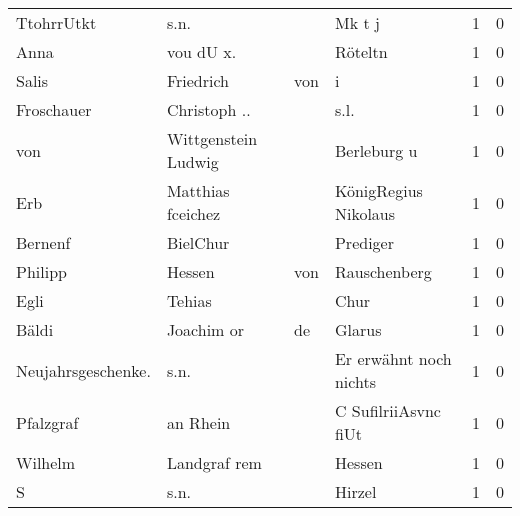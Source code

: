 \begin{center}
\begin{tiny}
\begin{longtabu}{llllrr}
               TtohrrUtkt &                               s.n. &             &                                      Mk t j &          1 &         0 \\
                     Anna &                          vou dU x. &             &                                     Röteltn &          1 &         0 \\
                    Salis &                          Friedrich &         von &                                           i &          1 &         0 \\
               Froschauer &                       Christoph .. &             &                                        s.l. &          1 &         0 \\
                      von &                Wittgenstein Ludwig &             &                                 Berleburg u &          1 &         0 \\
                      Erb &                  Matthias fceichez &             &                        KönigRegius Nikolaus &          1 &         0 \\
                  Bernenf &                           BielChur &             &                                    Prediger &          1 &         0 \\
                  Philipp &                             Hessen &         von &                                Rauschenberg &          1 &         0 \\
                     Egli &                             Tehias &             &                                        Chur &          1 &         0 \\
                    Bäldi &                         Joachim or &          de &                                      Glarus &          1 &         0 \\
       Neujahrsgeschenke. &                               s.n. &             &                      Er erwähnt noch nichts &          1 &         0 \\
                Pfalzgraf &                           an Rhein &             &                        C SufilriiAsvnc fiUt &          1 &         0 \\
                  Wilhelm &                       Landgraf rem &             &                                      Hessen &          1 &         0 \\
                        S &                               s.n. &             &                                      Hirzel &          1 &         0 \\

\end{longtabu}
\end{tiny}
\end{center}

